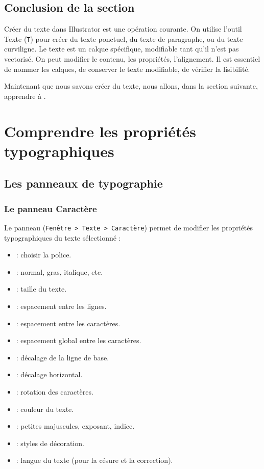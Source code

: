 \subsection*{Conclusion de la section}

Créer du texte dans Illustrator est une opération courante. On utilise l'outil Texte (\texttt{T}) pour créer du texte ponctuel, du texte de paragraphe, ou du texte curviligne. Le texte est un calque spécifique, modifiable tant qu'il n'est pas vectorisé. On peut modifier le contenu, les propriétés, l'alignement. Il est essentiel de nommer les calques, de conserver le texte modifiable, de vérifier la lisibilité.

Maintenant que nous savons créer du texte, nous allons, dans la section suivante, apprendre à .

\section{Comprendre les propriétés typographiques}

\subsection{Les panneaux de typographie}

\subsubsection{Le panneau Caractère}

Le panneau  (\texttt{Fenêtre > Texte > Caractère}) permet de modifier les propriétés typographiques du texte sélectionné :

\begin{itemize}
    \item {} : choisir la police.
    \item {} : normal, gras, italique, etc.
    \item {} : taille du texte.
    \item {} : espacement entre les lignes.
    \item {} : espacement entre les caractères.
    \item {} : espacement global entre les caractères.
    \item {} : décalage de la ligne de base.
    \item {} : décalage horizontal.
    \item {} : rotation des caractères.
    \item {} : couleur du texte.
    \item {} : petites majuscules, exposant, indice.
    \item {} : styles de décoration.
    \item {} : langue du texte (pour la césure et la correction).
\end{itemize}

